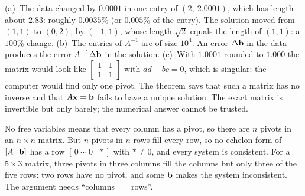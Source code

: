 \documentclass[11pt]{article}
\begin{document}
\begin{description}[leftmargin=0pt,itemsep=5pt]
  \item[Pause and think \ref{think:sensitivity}.] (a)~The data changed by $0.0001$ in one entry of $(2,\ 2.0001)$, which has length about $2.83$: roughly $0.0035\%$ (or $0.005\%$ of the entry). The solution moved from $(1,1)$ to $(0,2)$, by $(-1,1)$, whose length $\sqrt2$ equals the length of $(1,1)$: a $100\%$ change. (b)~The entries of $A^{-1}$ are of size $10^4$. An error $\Delta\mathbf{b}$ in the data produces the error $A^{-1}\Delta\mathbf{b}$ in the solution. (c)~With $1.0001$ rounded to $1.000$ the matrix would look like $\begin{bmatrix}1&1\\1&1\end{bmatrix}$ with $ad-bc=0$, which is singular: the computer would find only one pivot. The theorem says that such a matrix has no inverse and that $A\mathbf{x}=\mathbf{b}$ fails to have a unique solution. The exact matrix is invertible but only barely; the numerical answer cannot be trusted.
  \item[Pause and think \ref{think:explain}.] No free variables means that every column has a pivot, so there are $n$ pivots in an $n\times n$ matrix. But $n$ pivots in $n$ rows fill every row, so no echelon form of $[A\ \ \mathbf{b}]$ has a row $[\,0\ \cdots\ 0\mid\ast\,]$ with $\ast\neq0$, and every system is consistent. For a $5\times3$ matrix, three pivots in three columns fill the columns but only three of the five rows: two rows have no pivot, and some $\mathbf{b}$ makes the system inconsistent. The argument needs ``columns $=$ rows''.

\end{description}
\end{document}
